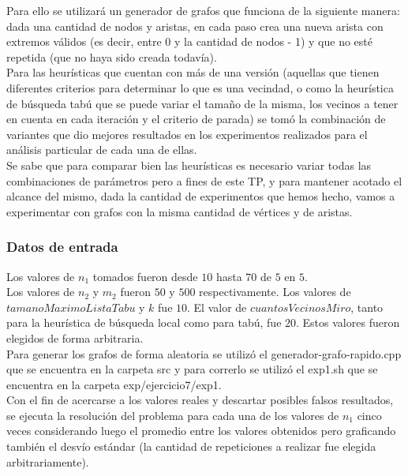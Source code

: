 Para ello se utilizará un generador de grafos que funciona de la siguiente manera: dada una cantidad de nodos y aristas, en cada paso crea una nueva arista con extremos válidos (es decir, entre 0 y la cantidad de nodos - 1) y que no esté repetida (que no haya sido creada todavía).\\
Para las heurísticas que cuentan con más de una versión (aquellas que tienen diferentes criterios para determinar lo que es una vecindad, o como la heurística de búsqueda tabú que se puede variar el tamaño de la misma, los vecinos a tener en cuenta en cada iteración y el criterio de parada) se tomó la combinación de variantes que dio mejores resultados en los experimentos realizados para el análisis particular de cada una de ellas.\\
Se sabe que para comparar bien las heurísticas es necesario variar todas las combinaciones de parámetros pero a fines de este TP, y para mantener acotado el alcance del mismo, dada la cantidad de experimentos que hemos hecho, vamos a experimentar con grafos con la misma cantidad de vértices y de aristas.

\subsubsection*{Datos de entrada}\;
\noindent Los valores de $n_1$ tomados fueron desde $10$ hasta $70$ de $5$ en $5$. \\
       Los valores de $n_2$ y $m_2$ fueron $50$ y $500$ respectivamente. Los valores de $tamanoMaximoListaTabu$ y $k$ fue $10$. El valor de $cuantosVecinosMiro$, tanto para la heurística de búsqueda local como para tabú, fue $20$. Estos valores fueron elegidos de forma arbitraria. \\
        Para generar los grafos de forma aleatoria se utilizó el generador-grafo-rapido.cpp que se encuentra en la carpeta src y para correrlo se utilizó el exp1.sh que se encuentra en la carpeta exp/ejercicio7/exp1. \\
        Con el fin de acercarse a los valores reales y descartar posibles falsos resultados, se ejecuta la resolución del problema para cada una de los valores de $n_1$ cinco veces considerando luego el promedio entre los valores obtenidos pero graficando también el desvío estándar (la cantidad de repeticiones a realizar fue elegida arbitrariamente).\; 

